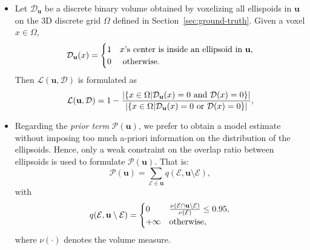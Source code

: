 \documentclass[journal]{IEEEtran}
\begin{document}
\begin{itemize}
\item Let $\mathcal{D}_{\mathbf{u}}$ be a discrete binary volume
  obtained by voxelizing all ellispoids in $\mathbf{u}$ on the 3D
  discrete grid $\Omega$ defined in
  Section~\ref{sec:ground-truth}. Given a voxel $x \in \Omega$,
  \begin{equation}
    \label{eq:configuration-voxel}
    \mathcal{\mathcal{D}_{\mathbf{u}}}(x) =
    \begin{cases}
      1 & x\textnormal{'s center is inside an ellipsoid in }\mathbf{u}, \\
      0 & \textnormal{ otherwise}. \\
    \end{cases}
  \end{equation}
  Then $\mathcal{L}(\mathbf{u}, \mathcal{D})$ is formulated as
  \begin{equation}
    \label{eq:data-term1-single}
    \mathcal{L}(\mathbf{u}, \mathcal{D}) = 1 - \frac{ |
      \{ x \in \Omega | \mathcal{D}_{\mathbf{u}}(x) = 0 \textnormal{
        and } \mathcal{D}(x) = 0 \} |} {
      |\{ x \in \Omega | \mathcal{D}_{\mathbf{u}}(x) = 0 \textnormal{
        or } \mathcal{D}(x) = 0 \}|},
  \end{equation}

\item Regarding the \textit{prior term} $\mathcal{P} (\mathbf{u})$, we
  prefer to obtain a model estimate without imposing too much a-priori
  information on the distribution of the ellipsoids. Hence, only a
  weak constraint on the overlap ratio between ellipsoids is used to
  formulate $\mathcal{P} (\mathbf{u})$. That is:
  \begin{equation}
    \label{eq:prior-term}
    \mathcal{P} (\mathbf{u}) = \sum_{\mathcal{E} \in \mathbf{u}}
    q(\mathcal{E}, \mathbf{u} \setminus \mathcal{E}),
  \end{equation}
  with
  \begin{equation}
    \label{eq:prior-term-detail}
    q(\mathcal{E}, \mathbf{u} \setminus \mathcal{E}) =
    \begin{cases}
      0 & \frac{\nu(\mathcal{E} \cap \mathbf{u} \setminus
        \mathcal{E})} {\nu(\mathcal{E})}
      \le 0.95, \\
      +\infty & \textnormal{otherwise},
    \end{cases}
  \end{equation}
  where $\nu(\cdot)$ denotes the volume measure.
\end{itemize}
\end{document}
